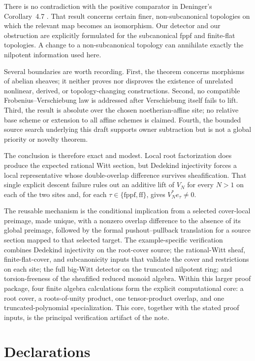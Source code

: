 \documentclass[11pt]{article}
\theoremstyle{definition}
\newcommand{\ff}{\mathrm{ff}}
\newcommand{\fppf}{\mathrm{fppf}}
\begin{document}
There is no contradiction with the positive comparator in Deninger's
Corollary~4.7 \cite[p.~24]{Deninger2025Rational}.  That result concerns
certain finer, non-subcanonical topologies on which the relevant map
becomes an isomorphism.  Our detector and our obstruction are explicitly
formulated for the subcanonical fppf and finite-flat topologies.  A change
to a non-subcanonical topology can annihilate exactly the nilpotent
information used here.

Several boundaries are worth recording.  First, the theorem concerns
morphisms of abelian sheaves; it neither proves nor disproves the existence
of unrelated nonlinear, derived, or topology-changing constructions.
Second, no compatible Frobenius--Verschiebung law is addressed after
Verschiebung itself fails to lift.  Third, the result is absolute over the
chosen noetherian-affine site; no relative base scheme or extension to all
affine schemes is claimed.  Fourth, the bounded source search underlying
this draft supports owner subtraction but is not a global priority or
novelty theorem.

The conclusion is therefore exact and modest.  Local root factorization
does produce the expected rational Witt section, but Dedekind injectivity
forces a local representative whose double-overlap difference survives
sheafification.  That single explicit descent failure rules out an additive lift of \(V_N\)
for every \(N>1\) on each of the two sites and, for each
\(\tau\in\{\fppf,\ff\}\), gives \(V_N^*e_\tau\ne0\).

The reusable mechanism is the conditional implication from a selected
cover-local preimage, made unique, with a nonzero overlap difference to
the absence of its global preimage, followed by the formal
pushout--pullback translation for a source section mapped to that selected
target.  The example-specific verification combines Dedekind injectivity on the
root-cover source; the rational-Witt sheaf, finite-flat-cover, and
subcanonicity inputs that validate the cover and restrictions on each site;
the full big-Witt detector on the truncated nilpotent ring; and
torsion-freeness of the sheafified reduced monoid algebra.  Within this larger proof package,
four finite algebra calculations form the explicit computational core: a
root cover, a roots-of-unity product, one tensor-product overlap, and one
truncated-polynomial specialization.  This core, together with the stated
proof inputs, is the principal verification artifact of the note.

\section*{Declarations}
\end{document}

